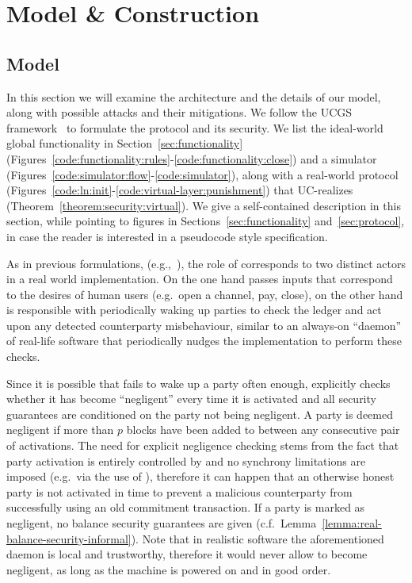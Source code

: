 \section{Model \& Construction}
  \subsection{Model}
  In this section we will examine the architecture and the details of our model,
  along with possible attacks and their mitigations. We follow the UCGS
  framework~\cite{DBLP:conf/tcc/BadertscherCHTZ20} to formulate the protocol and
  its security. We list the
  ideal-world global functionality \fchan in Section~\ref{sec:functionality}
  (Figures~\ref{code:functionality:rules}-\ref{code:functionality:close}) and a
  simulator \simulator (Figures~\ref{code:simulator:flow}-\ref{code:simulator}),
  along with a real-world protocol \pchan
  (Figures~\ref{code:ln:init}-\ref{code:virtual-layer:punishment}) that
  UC-realizes \fchan (Theorem~\ref{theorem:security:virtual}). We give a
  self-contained description in this section, while pointing to figures in
  Sections~\ref{sec:functionality} and~\ref{sec:protocol}, in case the reader is
  interested in a pseudocode style specification.

  As in previous formulations, (e.g.,~\cite{DBLP:conf/csfw/KiayiasL20}), the
  role of \environment corresponds to two distinct actors in a real world
  implementation. On the one hand \environment passes inputs that correspond to
  the desires of human users (e.g.\ open a channel, pay, close), on the other hand
  \environment is responsible with periodically waking up parties to check the
  ledger and act upon any detected counterparty misbehaviour, similar to an
  always-on ``daemon'' of real-life software that periodically nudges the
  implementation to perform these checks.

  Since it is possible that \environment fails to wake up a party often enough,
  \pchan explicitly checks whether it has become ``negligent'' every time it is
  activated and all security guarantees are conditioned on the party not being
  negligent. A party is deemed negligent if more than $p$ blocks have been added
  to \ledger between any consecutive pair of activations. The need for explicit
  negligence checking stems from the fact that party activation is entirely
  controlled by \environment and no synchrony limitations are imposed (e.g.\ via
  the use of \Fclock), therefore it can happen that an otherwise honest party is
  not activated in time to prevent a malicious counterparty from successfully
  using an old commitment transaction. If a party is marked as negligent, no
  balance security guarantees are given (c.f.\
  Lemma~\ref{lemma:real-balance-security-informal}). Note that in realistic
  software the aforementioned daemon is local and trustworthy, therefore it
  would never allow \pchan to become negligent, as long as the machine is
  powered on and in good order.

